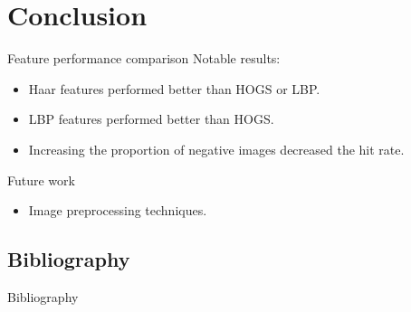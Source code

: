 \documentclass{beamer}
\begin{document}
\section{Conclusion}

\begin{frame}{Feature performance comparison}
	Notable results: \par
	\begin{itemize}
		\item Haar features performed better than HOGS or LBP.
		\item LBP features performed better than HOGS.
		\item Increasing the proportion of negative images decreased the hit rate.
	\end{itemize}
\end{frame}

\begin{frame}{Future work}
	\begin{itemize}
		\item Image preprocessing techniques.
	\end{itemize}
\end{frame}

\subsection{Bibliography}

\begin{frame}{Bibliography}
	\footnotesize
	
	
\end{frame}
\end{document}
